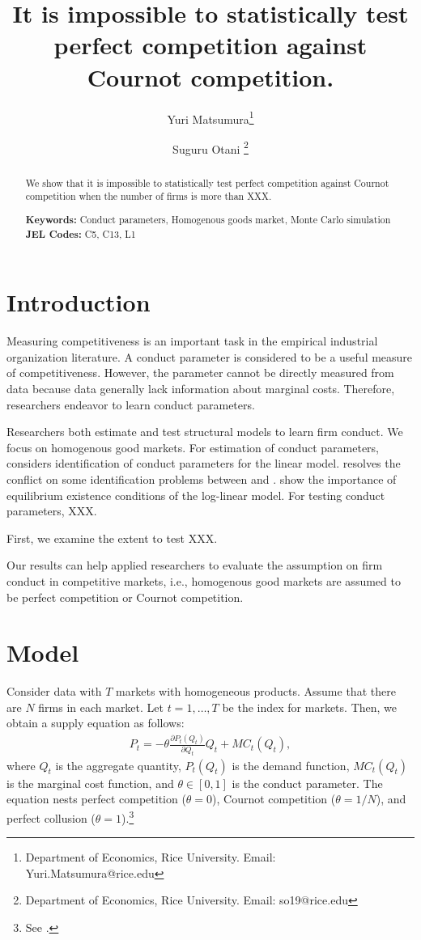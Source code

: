 \documentclass[11pt, a4paper]{article}
\title{It is impossible to statistically test perfect competition against Cournot competition.}
\author{Yuri Matsumura\thanks{Department of Economics, Rice University. Email: Yuri.Matsumura@rice.edu} \and Suguru Otani \thanks{Department of Economics, Rice University. Email: so19@rice.edu
}}
\begin{document}
\maketitle
\begin{abstract}
    We show that it is impossible to statistically test perfect competition against Cournot competition when the number of firms is more than XXX.
\vspace{0.1in}

\noindent\textbf{Keywords:} Conduct parameters, Homogenous goods market, Monte Carlo simulation
\vspace{0in}
\newline
\noindent\textbf{JEL Codes:} C5, C13, L1

\bigskip
\end{abstract}


\section{Introduction}
Measuring competitiveness is an important task in the empirical industrial organization literature.
A conduct parameter is considered to be a useful measure of competitiveness. 
However, the parameter cannot be directly measured from data because data generally lack information about marginal costs.
Therefore, researchers endeavor to learn conduct parameters.

Researchers both estimate and test structural models to learn firm conduct.
We focus on homogenous good markets.
For estimation of conduct parameters, \citet{bresnahan1982oligopoly} considers identification of conduct parameters for the linear model. \cite{matsumura2023resolving} resolves the conflict on some identification problems between \cite{bresnahan1982oligopoly} and \cite{perloff2012collinearity}. \cite{matsumura2023mpec} show the importance of equilibrium existence conditions of the log-linear model. 
For testing conduct parameters, XXX. 

First, we examine the extent to test XXX.

Our results can help applied researchers to evaluate the assumption on firm conduct in competitive markets, i.e., homogenous good markets are assumed to be perfect competition or Cournot competition.

\section{Model}
Consider data with $T$ markets with homogeneous products.
Assume that there are $N$ firms in each market.
Let $t = 1,\ldots, T$ be the index for markets.
Then, we obtain a supply equation as follows:
\begin{align}
     P_t = -\theta\frac{\partial P_t(Q_{t})}{\partial Q_{t}}Q_{t} + MC_t(Q_{t}),\label{eq:supply_equation}
\end{align}
where $Q_{t}$ is the aggregate quantity, $P_t(Q_{t})$ is the demand function, $MC_{t}(Q_{t})$ is the marginal cost function, and $\theta\in[0,1]$ is  the conduct parameter. 
The equation nests perfect competition ($\theta=0$), Cournot competition ($\theta=1/N$), and perfect collusion ($\theta=1$).\footnote{See \cite{bresnahan1982oligopoly}.} 
\end{document}

